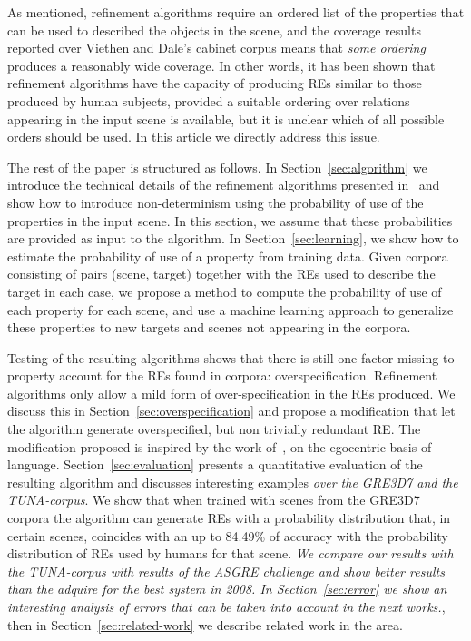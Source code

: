 As mentioned, refinement algorithms require an 
ordered list of the properties that can be used to described the objects in the scene, and the coverage results reported over Viethen and 
Dale's cabinet corpus means that \emph{some ordering} produces a reasonably wide coverage.  In other words, it has been shown that refinement algorithms have the capacity of producing REs similar to those produced by human subjects, provided a suitable ordering over relations appearing 
in the input scene is available, but it is unclear which of all possible orders should be used.  In this article we directly address this issue.  


The rest of the paper is structured as follows. In Section~\ref{sec:algorithm} we introduce the technical details of the 
refinement algorithms presented in~\cite{arec2:2008:Areces,arec:usin11} and show how to introduce non-determinism using 
the probability of use of the properties in the input scene. In this section, we assume that these probabilities are provided as 
input to the algorithm. In Section~\ref{sec:learning}, we show how to estimate the 
probability of use of a property from training data. Given corpora consisting of pairs (scene, target) together with the REs used to 
describe the target in each case, we propose a method to compute the probability of use of each property for each scene, and use a machine learning approach to generalize these properties to new targets and scenes not appearing in the corpora. 

Testing of the resulting algorithms shows that there is still one factor missing to property account for the REs found in corpora: overspecification.  Refinement algorithms only allow a mild form of over-specification in the REs produced.  We discuss this in 
Section~\ref{sec:overspecification} and propose a modification that let the algorithm generate overspecified, but non trivially redundant RE.  The modification proposed is inspired by the work of~, on the egocentric basis of language.  
Section~\ref{sec:evaluation} presents a quantitative evaluation of the resulting algorithm and discusses interesting examples \textit{over the GRE3D7 and the TUNA-corpus}. 
We show that when trained with scenes from the GRE3D7 corpora the algorithm can generate REs with a probability distribution that, 
in certain scenes, coincides with an up to 84.49\% of accuracy with the probability distribution of REs used by humans for that scene. 
\textit{We compare our results with the TUNA-corpus with results of the ASGRE challenge and show better results than the adquire for the best system in 2008.
In Section~\ref{sec:error} we show an interesting analysis of errors that can be taken into account in the next works.}, then in Section~\ref{sec:related-work} we describe related work in the area.

